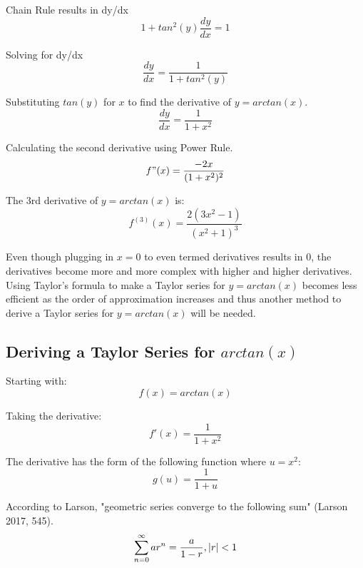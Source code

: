 \documentclass[12pt, titlepage]{article}
\begin{document}
Chain Rule results in dy/dx
\begin{equation*}
 1 + tan^{2}(y) \frac{dy}{dx}  = 1
\end{equation*}

Solving for dy/dx
\begin{equation*}
 \frac{dy}{dx}  = \frac{1}{1 + tan^{2}(y)}
\end{equation*}

Substituting \(tan(y)\) for \(x\) to find the derivative of \(y = arctan(x)\).
\begin{equation*}
 \frac{dy}{dx}  = \frac{1}{1 + x^{2}}
\end{equation*}

Calculating the second derivative using Power Rule.
\begin{equation*}
    f"(x) = \frac{-2x}{(1+x^{2})^{2}}
\end{equation*}

The 3rd derivative of \(y = arctan(x)\) is:
\begin{equation*}
    f^{(3)}(x) = \frac{2(3x^{2}-1)}{(x^{2}+1)^{3}}
\end{equation*}

Even though plugging in \(x = 0\) to even termed derivatives results in 0, the derivatives become more and more complex with higher and higher derivatives. Using Taylor's formula to make a Taylor series for \(y = arctan(x)\) becomes less efficient as the order of approximation increases and thus another method to derive a Taylor series for \(y = arctan(x)\) will be needed.

\subsection{Deriving a Taylor Series for \(arctan(x)\)}
Starting with:
\begin{equation*}
  f(x) = arctan(x)
\end{equation*}

Taking the derivative:
\begin{equation*}
f'(x) = \frac{1}{1 + x^{2}}
\end{equation*}

The derivative has the form of the following function where \(u = x^2\):
\begin{equation*}
    g(u) = \frac{1}{1+u}
\end{equation*}

According to Larson, "geometric series converge to the following sum" (Larson 2017, 545).
\begin{equation*}
	\sum_{n=0}^{\infty} ar^{n} = \frac{a}{1-r} , \abs{r} < 1
\end{equation*}
\end{document}
